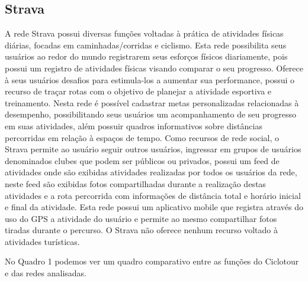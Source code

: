 \subsection{Strava}
A rede Strava \cite{strava} possui diversas funções voltadas à prática de atividades físicas diárias, focadas em caminhadas/corridas e ciclismo. Esta
rede possibilita seus usuários ao redor do mundo registrarem seus esforços físicos diariamente, pois possui um registro de atividades físicas visando 
comparar o seu progresso. Oferece à seus usuários desafios para estimula-los a aumentar sua performance, possui o recurso de traçar rotas com o 
objetivo de planejar a atividade esportiva e treinamento. Nesta rede é possível cadastrar metas personalizadas relacionadas à desempenho, 
possibilitando seus usuários um acompanhamento de seu progresso em suas atividades, além possuir quadros informativos sobre distâncias percorridas 
em relação à espaços de tempo. Como recursos de rede social, o Strava permite ao usuário seguir outros usuários, ingressar em grupos de usuários 
denominados clubes que podem ser públicos ou privados, possui um feed de atividades onde são exibidas atividades realizadas por todos os usuários da 
rede, neste feed são exibidas fotos compartilhadas durante a realização destas atividades e a rota percorrida com informações de distância total e 
horário inicial e final da atividade. Esta rede possui um aplicativo mobile que registra através do uso do GPS a atividade do usuário e permite ao 
mesmo compartilhar fotos tiradas durante o percurso. O Strava não oferece nenhum recurso voltado à atividades turísticas.

No Quadro 1 podemos ver um quadro comparativo entre as funções do Ciclotour e das redes analisadas.

